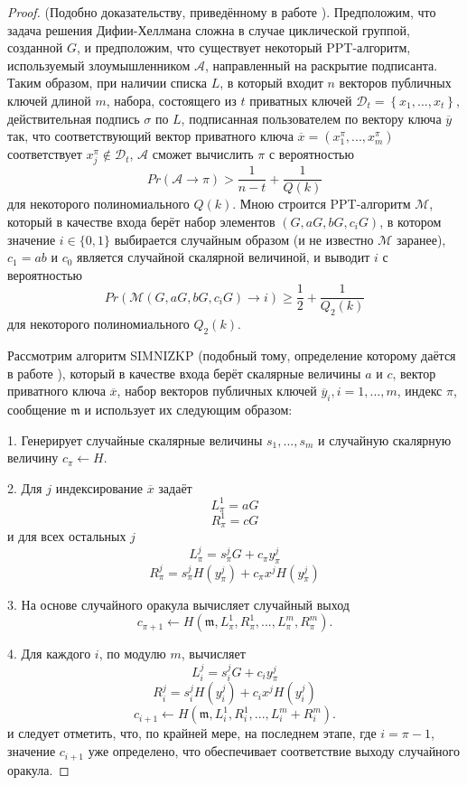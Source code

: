 \documentclass{mrl}
\theoremstyle{definition}
\numberwithin{thm}{section}
\begin{document}
\begin{proof}
(Подобно доказательству, приведённому в работе \cite[Теорема 2]{LWW}). Предположим, что задача решения Дифии-Хеллмана сложна в случае циклической группой, созданной $G$, и предположим, что существует некоторый PPT-алгоритм, используемый злоумышленником $\mathcal{A}$, направленный на раскрытие подписанта. Таким образом, при наличии списка $L$, в который входит $n$ векторов публичных ключей длиной $m$, набора, состоящего из $t$ приватных ключей $\mathcal{D}_{t}=\left\{ x_{1},...,x_{t}\right\} $, действительная подпись $\sigma$ по $L$, подписанная пользователем по вектору ключа $\overline{y}$ так, что соответствующий вектор приватного ключа $\overline{x}=\left(x_{1}^{\pi},...,x_{m}^{\pi}\right)$
соответствует $x_{j}^{\pi}\notin\mathcal{D}_{t}$, $\mathcal{A}$ сможет вычислить $\pi$ с вероятностью
\[
Pr\left(\mathcal{A}\to\pi\right)>\frac{1}{n-t}+\frac{1}{Q\left(k\right)}
\]
для некоторого полиномиального $Q\left(k\right)$. Мною строится PPT-алгоритм $\mathcal{M}$, который в качестве входа берёт набор элементов $\left(G,aG,bG,c_{i}G\right)$, в котором значение $i\in \{0,1\}$ выбирается случайным образом (и не известно $\mathcal{M}$ заранее), $c_{1}=ab$ и $c_{0}$ является случайной скалярной величиной, и выводит $i$ с вероятностью
\[
Pr\left(\mathcal{M}\left(G, aG,bG,c_{i}G\right)\to i\right)\ge\frac{1}{2}+\frac{1}{Q_{2}\left(k\right)}
\]
для некоторого полиномиального $Q_{2}\left(k\right)$.

Рассмотрим алгоритм SIMNIZKP (подобный тому, определение которому даётся в работе \cite{FS}), который в качестве входа берёт скалярные величины $a$ и $c$, вектор приватного ключа $\overline{x}$, набор векторов публичных ключей $\overline{y}_{i},i=1,...,m$, индекс $\pi$, сообщение $\mathfrak{m}$ и использует их следующим образом:

1. Генерирует случайные скалярные величины $s_{1},...,s_{m}$ и случайную скалярную величину $c_{\pi}\leftarrow H$.

2. Для $j$ индексирование $\overline{x}$ задаёт
\[
L_{\pi}^{1}=aG
\]
\[
R_{\pi}^{1}=cG
\]
и для всех остальных $j$
\[
L_{\pi}^{j}=s_{\pi}^{j}G+c_{\pi}y_{\pi}^{j}
\]
\[
R_{\pi}^{j}=s_{\pi}^{j}H\left(y_{\pi}^{j}\right)+c_{\pi}x^{j}H\left(y_{\pi}^{j}\right)
\]

3. На основе случайного оракула вычисляет случайный выход
\[
c_{\pi+1}\leftarrow H\left(\mathfrak{m},L_{\pi}^{1},R_{\pi}^{1},...,L_{\pi}^{m},R_{\pi}^{m}\right).
\]

4. Для каждого $i$, по модулю $m$, вычисляет
\[
L_{i}^{j}=s_{i}^{j}G+c_{i}y_{\pi}^{j}
\]
\[
R_{i}^{j}=s_{i}^{j}H\left(y_{i}^{j}\right)+c_{i}x^{j}H\left(y_{i}^{j}\right)
\]
\[
c_{i+1}\leftarrow H\left(\mathfrak{m},L_{i}^{1},R_{i}^{1},...,L_{i}^{m}+R_{i}^{m}\right).
\]
и следует отметить, что, по крайней мере, на последнем этапе, где $i=\pi-1$, значение $c_{i+1}$ уже определено, что обеспечивает соответствие выходу случайного оракула.


\end{proof}
\end{document}
